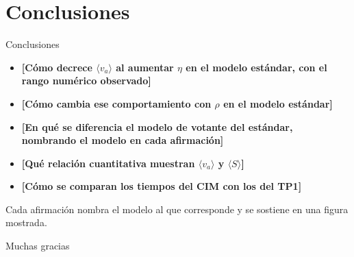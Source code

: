 \documentclass[aspectratio=169,10pt]{beamer}
\newcommand{\pend}[1]{{\color{red}\textbf{[#1]}}}
\begin{document}
\section*{Conclusiones}
\begin{frame}\sectionpage\end{frame}

\begin{frame}{Conclusiones}
  \begin{itemize}
    \item \pend{Cómo decrece $\langle v_a\rangle$ al aumentar $\eta$ en el modelo estándar, con el rango numérico observado}
    \item \pend{Cómo cambia ese comportamiento con $\rho$ en el modelo estándar}
    \item \pend{En qué se diferencia el modelo de votante del estándar, nombrando el modelo en cada afirmación}
    \item \pend{Qué relación cuantitativa muestran $\langle v_a\rangle$ y $\langle S\rangle$}
    \item \pend{Cómo se comparan los tiempos del CIM con los del TP1}
  \end{itemize}
  \vspace{0.5em}
  {\scriptsize Cada afirmación nombra el modelo al que corresponde y se sostiene en una figura mostrada.}
\end{frame}

\begin{frame}
  \centering\vfill{\Large Muchas gracias}\vfill
\end{frame}
\end{document}
